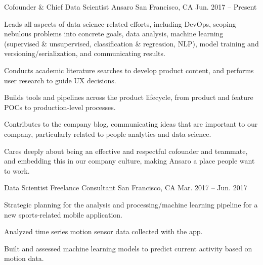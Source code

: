 
\begin{cventries}

  \cventry
    {Cofounder \& Chief Data Scientist} %
    {Ansaro} %
    {San Francisco, CA} %
    {Jun. 2017 -- Present} %
    {
      \begin{cvitems} %
        \item {Leads all aspects of data science-related efforts, including DevOps, scoping nebulous problems into concrete goals, data analysis, machine learning (supervised \& unsupervised, classification \& regression, NLP), model training and versioning/serialization, and communicating results.}
        \item {Conducts academic literature searches to develop product content, and performs user research to guide UX decisions.}
        \item {Builds tools and pipelines across the product lifecycle, from product and feature POCs to production-level processes.}
        \item {Contributes to the company blog, communicating ideas that are important to our company, particularly related to people analytics and data science.}
        \item {Cares deeply about being an effective and respectful cofounder and teammate, and embedding this in our company culture, making Ansaro a place people want to work.}
     \end{cvitems}
    }

  \cventry
    {Data Scientist} %
    {Freelance Consultant} %
    {San Francisco, CA} %
    {Mar. 2017 -- Jun. 2017} %
    {
      \begin{cvitems} %
        \item {Strategic planning for the analysis and processing/machine learning pipeline for a new sports-related mobile application.}
        \item {Analyzed time series motion sensor data collected with the app.}
        \item {Built and assessed machine learning models to predict current activity based on motion data.}
     \end{cvitems}
    }


\end{cventries}
